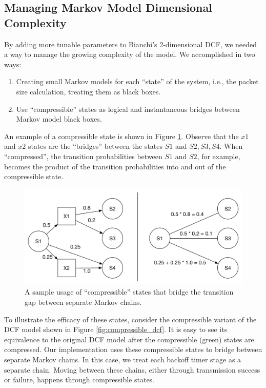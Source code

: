 \documentclass{llncs}
\begin{document}
\subsection{Managing Markov Model Dimensional Complexity}
By adding more tunable parameters to Bianchi's 2-dimensional DCF, we needed a way to manage the growing complexity of the model. We accomplished in two ways:
\begin{enumerate}
	\item Creating small Markov models for each ``state'' of the system, i.e., the packet size calculation, treating them as black boxes.
	\item Use ``compressible'' states as logical and instantaneous bridges between Markov model black boxes.
\end{enumerate}
An example of a compressible state is shown in Figure \ref{fig:collapses}. Observe that the $x1$ and $x2$ states are the ``bridges'' between the states $S1$ and $S2,S3,S4$. When ``compressed'', the transition probabilities between $S1$ and $S2$, for example, becomes the product of the transition probabilities into and out of the compressible state. 

\begin{figure}
\begin{center}
\includegraphics[scale=0.4]{../../sketches/collapses.pdf}
\caption{A sample usage of ``compressible'' states that bridge the transition gap between separate Markov chains.}
\label{fig:collapses}
\end{center}
\end{figure}

To illustrate the efficacy of these states, consider the compressible variant of the DCF model shown in Figure \ref{fig:compressible_dcf}. It is easy to see its equivalence to the original DCF model after the compressible (green) states are compressed. Our implementation uses these compressible states to bridge between separate Markov chains. In this case, we treat each backoff timer stage as a separate chain. Moving between these chains, either through transmission success or failure, happens through compressible states.
\end{document}
